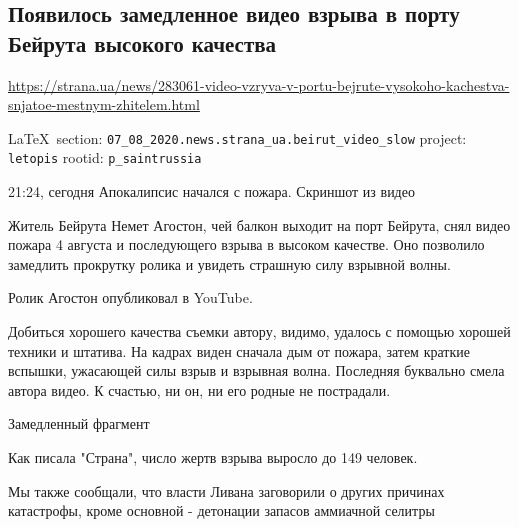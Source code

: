  
 
\subsection{Появилось замедленное видео взрыва в порту Бейрута высокого качества}
\label{sec:07_08_2020.news.strana_ua.beirut_video_slow}
\url{https://strana.ua/news/283061-video-vzryva-v-portu-bejrute-vysokoho-kachestva-snjatoe-mestnym-zhitelem.html}

  
\vspace{0.5cm}
 {\ifDEBUG\small\LaTeX~section: \verb|07_08_2020.news.strana_ua.beirut_video_slow| project: \verb|letopis| rootid: \verb|p_saintrussia| \fi}
\vspace{0.5cm}

21:24, сегодня Апокалипсис начался с пожара. Скриншот из видео 

Житель Бейрута Немет Агостон, чей балкон выходит на порт Бейрута, снял видео
пожара 4 августа и последующего взрыва в высоком качестве. Оно позволило
замедлить прокрутку ролика и увидеть страшную силу взрывной волны.

Ролик Агостон опубликовал в YouTube.

Добиться хорошего качества съемки автору, видимо, удалось с помощью хорошей
техники и штатива. На кадрах виден сначала дым от пожара, затем краткие
вспышки, ужасающей силы взрыв и взрывная волна. Последняя буквально смела
автора видео. К счастью, ни он, ни его родные не пострадали.

Замедленный фрагмент

Как писала "Страна", число жертв взрыва выросло до 149 человек.

Мы также сообщали, что власти Ливана заговорили о других причинах катастрофы,
кроме основной - детонации запасов аммиачной селитры
  
